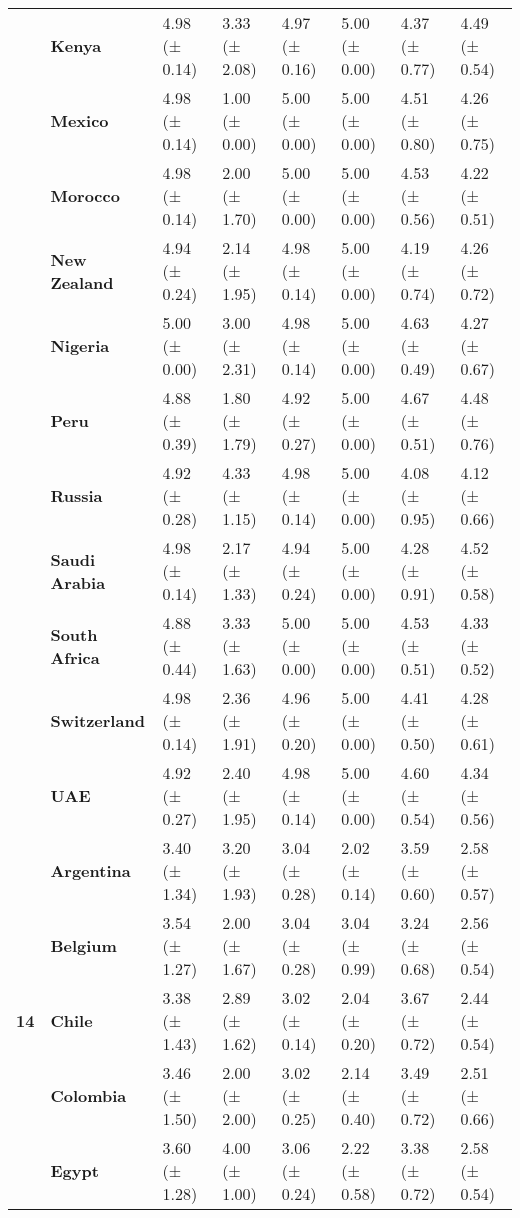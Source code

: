 \begin{longtable}{llllllll}
\textbf{} & \textbf{Kenya} & 4.98 (± 0.14) & 3.33 (± 2.08) & 4.97 (± 0.16) & 5.00 (± 0.00) & 4.37 (± 0.77) & 4.49 (± 0.54) \\
\textbf{} & \textbf{Mexico} & 4.98 (± 0.14) & 1.00 (± 0.00) & 5.00 (± 0.00) & 5.00 (± 0.00) & 4.51 (± 0.80) & 4.26 (± 0.75) \\
\textbf{} & \textbf{Morocco} & 4.98 (± 0.14) & 2.00 (± 1.70) & 5.00 (± 0.00) & 5.00 (± 0.00) & 4.53 (± 0.56) & 4.22 (± 0.51) \\
\textbf{} & \textbf{New Zealand} & 4.94 (± 0.24) & 2.14 (± 1.95) & 4.98 (± 0.14) & 5.00 (± 0.00) & 4.19 (± 0.74) & 4.26 (± 0.72) \\
\textbf{} & \textbf{Nigeria} & 5.00 (± 0.00) & 3.00 (± 2.31) & 4.98 (± 0.14) & 5.00 (± 0.00) & 4.63 (± 0.49) & 4.27 (± 0.67) \\
\textbf{} & \textbf{Peru} & 4.88 (± 0.39) & 1.80 (± 1.79) & 4.92 (± 0.27) & 5.00 (± 0.00) & 4.67 (± 0.51) & 4.48 (± 0.76) \\
\textbf{} & \textbf{Russia} & 4.92 (± 0.28) & 4.33 (± 1.15) & 4.98 (± 0.14) & 5.00 (± 0.00) & 4.08 (± 0.95) & 4.12 (± 0.66) \\
\textbf{} & \textbf{Saudi Arabia} & 4.98 (± 0.14) & 2.17 (± 1.33) & 4.94 (± 0.24) & 5.00 (± 0.00) & 4.28 (± 0.91) & 4.52 (± 0.58) \\
\textbf{} & \textbf{South Africa} & 4.88 (± 0.44) & 3.33 (± 1.63) & 5.00 (± 0.00) & 5.00 (± 0.00) & 4.53 (± 0.51) & 4.33 (± 0.52) \\
\textbf{} & \textbf{Switzerland} & 4.98 (± 0.14) & 2.36 (± 1.91) & 4.96 (± 0.20) & 5.00 (± 0.00) & 4.41 (± 0.50) & 4.28 (± 0.61) \\
\textbf{} & \textbf{UAE} & 4.92 (± 0.27) & 2.40 (± 1.95) & 4.98 (± 0.14) & 5.00 (± 0.00) & 4.60 (± 0.54) & 4.34 (± 0.56) \\
\cline{1-8}
\multirow[t]{19}{*}{\textbf{14}} & \textbf{Argentina} & 3.40 (± 1.34) & 3.20 (± 1.93) & 3.04 (± 0.28) & 2.02 (± 0.14) & 3.59 (± 0.60) & 2.58 (± 0.57) \\
\textbf{} & \textbf{Belgium} & 3.54 (± 1.27) & 2.00 (± 1.67) & 3.04 (± 0.28) & 3.04 (± 0.99) & 3.24 (± 0.68) & 2.56 (± 0.54) \\
\textbf{} & \textbf{Chile} & 3.38 (± 1.43) & 2.89 (± 1.62) & 3.02 (± 0.14) & 2.04 (± 0.20) & 3.67 (± 0.72) & 2.44 (± 0.54) \\
\textbf{} & \textbf{Colombia} & 3.46 (± 1.50) & 2.00 (± 2.00) & 3.02 (± 0.25) & 2.14 (± 0.40) & 3.49 (± 0.72) & 2.51 (± 0.66) \\
\textbf{} & \textbf{Egypt} & 3.60 (± 1.28) & 4.00 (± 1.00) & 3.06 (± 0.24) & 2.22 (± 0.58) & 3.38 (± 0.72) & 2.58 (± 0.54) \\

\end{longtable}
